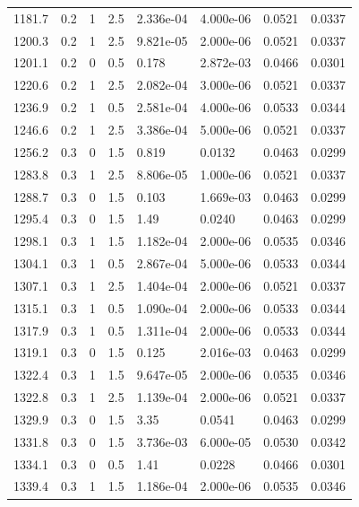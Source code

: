 \documentclass[preview]{standalone}
\begin{document}
{{{\begin{tabular}{L{1.2cm}C{1.2cm} C{0.3cm}C{0.5cm} C{1.4cm}C{1.4cm} C{1.4cm}C{1.4cm}}
  1181.7  &   0.2  & 1     & 2.5 &  2.336e-04  & 4.000e-06  & 0.0521 &  0.0337   \\ 
  1200.3  &   0.2  & 1     & 2.5 &  9.821e-05  & 2.000e-06  & 0.0521 &  0.0337   \\ 
  1201.1  &   0.2  & 0     & 0.5 &  0.178  & 2.872e-03  & 0.0466 &  0.0301   \\ 
  1220.6  &   0.2  & 1     & 2.5 &  2.082e-04  & 3.000e-06  & 0.0521 &  0.0337   \\ 
  1236.9  &   0.2  & 1     & 0.5 &  2.581e-04  & 4.000e-06  & 0.0533 &  0.0344   \\ 
  1246.6  &   0.2  & 1     & 2.5 &  3.386e-04  & 5.000e-06  & 0.0521 &  0.0337   \\ 
  1256.2  &   0.3  & 0     & 1.5 &  0.819  & 0.0132  & 0.0463 &  0.0299   \\ 
  1283.8  &   0.3  & 1     & 2.5 &  8.806e-05  & 1.000e-06  & 0.0521 &  0.0337   \\ 
  1288.7  &   0.3  & 0     & 1.5 &  0.103  & 1.669e-03  & 0.0463 &  0.0299   \\ 
  1295.4  &   0.3  & 0     & 1.5 &  1.49  & 0.0240  & 0.0463 &  0.0299   \\ 
  1298.1  &   0.3  & 1     & 1.5 &  1.182e-04  & 2.000e-06  & 0.0535 &  0.0346   \\ 
  1304.1  &   0.3  & 1     & 0.5 &  2.867e-04  & 5.000e-06  & 0.0533 &  0.0344   \\ 
  1307.1  &   0.3  & 1     & 2.5 &  1.404e-04  & 2.000e-06  & 0.0521 &  0.0337   \\ 
  1315.1  &   0.3  & 1     & 0.5 &  1.090e-04  & 2.000e-06  & 0.0533 &  0.0344   \\ 
  1317.9  &   0.3  & 1     & 0.5 &  1.311e-04  & 2.000e-06  & 0.0533 &  0.0344   \\ 
  1319.1  &   0.3  & 0     & 1.5 &  0.125  & 2.016e-03  & 0.0463 &  0.0299   \\ 
  1322.4  &   0.3  & 1     & 1.5 &  9.647e-05  & 2.000e-06  & 0.0535 &  0.0346   \\ 
  1322.8  &   0.3  & 1     & 2.5 &  1.139e-04  & 2.000e-06  & 0.0521 &  0.0337   \\ 
  1329.9  &   0.3  & 0     & 1.5 &  3.35  & 0.0541  & 0.0463 &  0.0299   \\ 
  1331.8  &   0.3  & 0     & 1.5 &  3.736e-03  & 6.000e-05  & 0.0530 &  0.0342   \\ 
  1334.1  &   0.3  & 0     & 0.5 &  1.41  & 0.0228  & 0.0466 &  0.0301   \\ 
  1339.4  &   0.3  & 1     & 1.5 &  1.186e-04  & 2.000e-06  & 0.0535 &  0.0346   \\ 

\end{tabular}}}}
\end{document}
